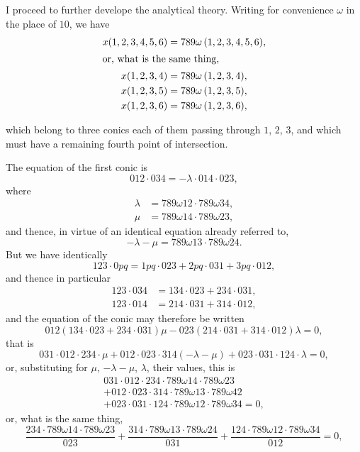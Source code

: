 \documentclass[11pt,a4paper]{article}
\begin{document}
I proceed to further develope the analytical theory. Writing for convenience $\omega$ in the place of $10$, we have
\begin{align*}
x(1, 2, 3, 4, 5, 6) &= 789\omega\,(1, 2, 3, 4, 5, 6),\\
\shortintertext{or, what is the same thing,}
x(1, 2, 3, 4) &= 789\omega\,(1, 2, 3, 4),\\
x(1, 2, 3, 5) &= 789\omega\,(1, 2, 3, 5),\\
x(1, 2, 3, 6) &= 789\omega\,(1, 2, 3, 6),
\end{align*}

\newpage
\setcounter{page}{502}

which belong to three conics each of them passing through $1$, $2$, $3$, and which must have a remaining fourth point of intersection.

The equation of the first conic is
\[
012 \cdot 034 = -\lambda \cdot 014 \cdot 023,
\]
where
\begin{align*}
\lambda &= 789\omega 12 \cdot 789\omega 34,\\
\mu &= 789\omega 14 \cdot 789\omega 23,
\end{align*}
and thence, in virtue of an identical equation already referred to,
\[
-\lambda - \mu = 789\omega 13 \cdot 789\omega 24.
\]
But we have identically
\[
123 \cdot 0pq = 1pq \cdot 023 + 2pq \cdot 031 + 3pq \cdot 012,
\]
and thence in particular
\begin{align*}
123 \cdot 034 &= 134 \cdot 023 + 234 \cdot 031,\\
123 \cdot 014 &= 214 \cdot 031 + 314 \cdot 012,
\end{align*}
and the equation of the conic may therefore be written
\[
012 (134 \cdot 023 + 234 \cdot 031)\mu - 023 (214 \cdot 031 + 314 \cdot 012)\lambda = 0,
\]
that is
\[
031 \cdot 012 \cdot 234 \cdot \mu + 012 \cdot 023 \cdot 314(-\lambda-\mu) + 023 \cdot 031 \cdot 124 \cdot \lambda = 0,
\]
or, substituting for $\mu$, $-\lambda-\mu$, $\lambda$, their values, this is
\begin{multline*}
031 \cdot 012 \cdot 234 \cdot 789\omega 14 \cdot 789\omega 23\\
+ 012 \cdot 023 \cdot 314 \cdot 789\omega 13 \cdot 789\omega 42\\
+ 023 \cdot 031 \cdot 124 \cdot 789\omega 12 \cdot 789\omega 34 = 0,
\end{multline*}
or, what is the same thing,
\[
\frac{234 \cdot 789\omega 14 \cdot 789\omega 23}{023}
+ \frac{314 \cdot 789\omega 13 \cdot 789\omega 24}{031}
+ \frac{124 \cdot 789\omega 12 \cdot 789\omega 34}{012} = 0,
\]
\end{document}
